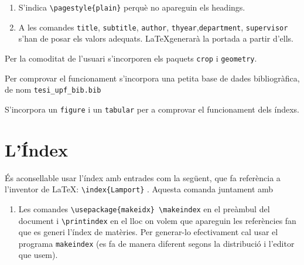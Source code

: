 \documentclass[11pt, a4paper,twoside]{tfg_dtic_upf}
\numberwithin{equation}{section}
\begin{document}
\begin{description}
\begin{enumerate}
  \item S'indica \verb+\pagestyle{plain}+ perquè no apareguin els headings.

  \item  A les comandes {\tt title}, {\tt subtitle}, {\tt author}, {\tt thyear},{\tt department}, {\tt supervisor} s'han de posar els valors adequats. \LaTeX generarà la portada a partir d'ells.
  \end{enumerate}

\item[paquets] Per la comoditat de l'usuari s'incorporen els paquets {\tt crop} i {\tt geometry}. 

\item[Bibliografia] Per comprovar el funcionament s'incorpora una petita base de dades bibliogràfica, de nom \verb+tesi_upf_bib.bib+


\item[Taules] S'incorpora un \verb+figure+ i un \verb+tabular+ per a comprovar el funcionament dels índexs.

\end{description}


\section*{L'Índex}

És aconsellable usar l'índex amb entrades com la següent, que fa referència a l'inventor de \LaTeX:  \verb+\index{Lamport}+ . Aquesta comanda juntament amb
\begin{enumerate}
\item Les comandes \verb+\usepackage{makeidx} \makeindex+ en el preàmbul del document i \verb+\printindex+ en el lloc on volem que apareguin les referències fan que es generi l'índex de matèries. Per generar-lo efectivament cal usar el programa \verb+makeindex+ (es fa de manera diferent segons la distribució i l'editor que usem).
\end{enumerate}
\end{document}
